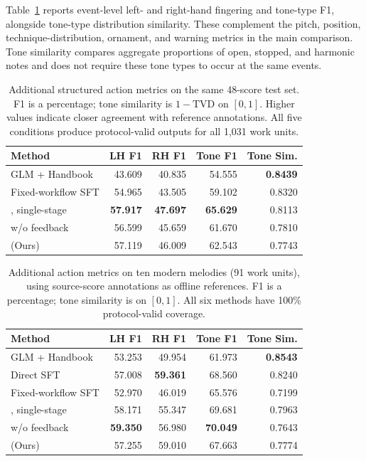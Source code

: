 Table~\ref{tab:detailed-actions} reports event-level left- and right-hand fingering and tone-type F1, alongside tone-type distribution similarity. These complement the pitch, position, technique-distribution, ornament, and warning metrics in the main comparison. Tone similarity compares aggregate proportions of open, stopped, and harmonic notes and does not require these tone types to occur at the same events.

\begin{table}[htbp]
\centering\footnotesize
\setlength{\tabcolsep}{3pt}
\begin{tabularx}{\linewidth}{@{}Xrrrr@{}}
\toprule
Method & LH F1 & RH F1 & Tone F1 & Tone Sim. \\
\midrule
GLM + Handbook & 43.609 & 40.835 & 54.555 & \textbf{0.8439} \\
Fixed-workflow SFT & 54.965 & 43.505 & 59.102 & 0.8320 \\
\midrule
\system{}, single-stage & \textbf{57.917} & \textbf{47.697} & \textbf{65.629} & 0.8113 \\
\system{} w/o feedback & 56.599 & 45.659 & 61.670 & 0.7810 \\
\system{} (Ours) & 57.119 & 46.009 & 62.543 & 0.7743 \\
\bottomrule
\end{tabularx}
\caption{Additional structured action metrics on the same 48-score test set. F1 is a percentage; tone similarity is $1-\mathrm{TVD}$ on $[0,1]$. Higher values indicate closer agreement with reference annotations. All five conditions produce protocol-valid outputs for all 1,031 work units.}
\label{tab:detailed-actions}
\end{table}

\begin{table}[htbp]
\centering\footnotesize
\setlength{\tabcolsep}{3pt}
\begin{tabularx}{\linewidth}{@{}Xrrrr@{}}
\toprule
Method & LH F1 & RH F1 & Tone F1 & Tone Sim. \\
\midrule
GLM + Handbook & 53.253 & 49.954 & 61.973 & \textbf{0.8543} \\
Direct SFT & 57.008 & \textbf{59.361} & 68.560 & 0.8240 \\
Fixed-workflow SFT & 52.970 & 46.019 & 65.576 & 0.7199 \\
\midrule
\system{}, single-stage & 58.171 & 55.347 & 69.681 & 0.7963 \\
\system{} w/o feedback & \textbf{59.350} & 56.980 & \textbf{70.049} & 0.7643 \\
\system{} (Ours) & 57.255 & 59.010 & 67.663 & 0.7774 \\
\bottomrule
\end{tabularx}
\caption{Additional action metrics on ten modern melodies (91 work units), using source-score annotations as offline references. F1 is a percentage; tone similarity is on $[0,1]$. All six methods have 100\% protocol-valid coverage.}
\label{tab:modern-detailed-actions}
\end{table}

